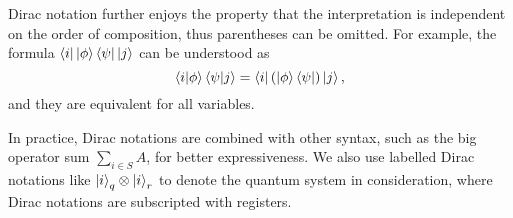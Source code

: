\documentclass[runningheads]{llncs}
\begin{document}
Dirac notation further enjoys the property that the interpretation is independent on the order of composition, thus parentheses can be omitted. For example, the formula \(\bra{i}\ket{\phi}\bra{\psi}\ket{j}\) can be understood as
\[
    \braket{i|\phi}\braket{\psi|j} = \bra{i} (\ket{\phi}\bra{\psi}) \ket{j},
\]
and they are equivalent for all variables.


In practice, Dirac notations are combined with other syntax, such as the big operator sum $\sum_{i \in S} A$, for better expressiveness. We also use labelled Dirac notations like $\ket{i}_q \otimes \ket{i}_r$ to denote the quantum system in consideration, where Dirac notations are subscripted with registers.
\end{document}
